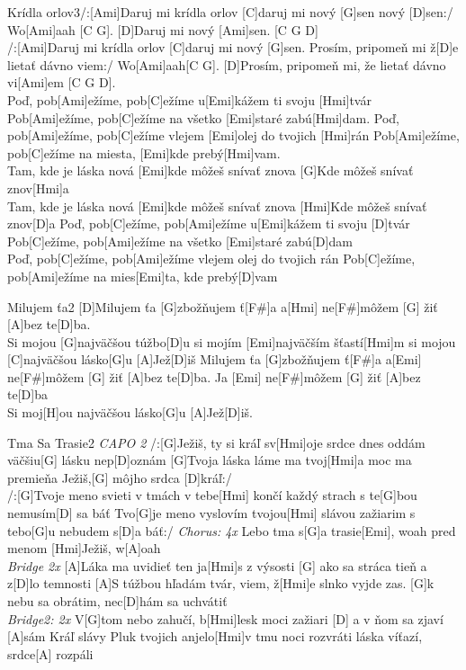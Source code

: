 \documentclass[12pt]{article}
\begin{document}
\begin{song}{Krídla orlov}{3}/:[Ami]Daruj mi krídla orlov
	[C]daruj mi nový [G]sen
	nový [D]sen:/ Wo[Ami]aah [C G].
	[D]Daruj mi nový [Ami]sen. [C G D] 
	\\
	/:[Ami]Daruj mi krídla orlov
	[C]daruj mi nový [G]sen.
	Prosím, pripomeň mi
	ž[D]e lietať dávno viem:/ 
	Wo[Ami]aah[C G].
	[D]Prosím, pripomeň mi,
	že lietať dávno vi[Ami]em [C G D].
	\\
	Poď, pob[Ami]ežíme, pob[C]ežíme
	u[Emi]kážem ti svoju [Hmi]tvár
	Pob[Ami]ežíme, pob[C]ežíme
	na všetko [Emi]staré zabú[Hmi]dam.
	\columnbreak
	Poď, pob[Ami]ežíme, pob[C]ežíme
	vlejem [Emi]olej do tvojich [Hmi]rán
	Pob[Ami]ežíme, pob[C]ežíme
	na miesta, [Emi]kde prebý[Hmi]vam.
	\\
	[C]Tam, kde je láska nová
	[Emi]kde môžeš snívať znova
	[G]Kde môžeš snívať znov[Hmi]a
	\\
	[Ami]Tam, kde je láska nová
	[Emi]kde môžeš snívať znova
	[Hmi]Kde môžeš snívať znov[D]a
	\columnbreak
	Poď, pob[C]ežíme, pob[Ami]ežíme
	u[Emi]kážem ti svoju [D]tvár
	Pob[C]ežíme, pob[Ami]ežíme
	na všetko [Emi]staré zabú[D]dam
	\\
	Poď, pob[C]ežíme, pob[Ami]ežíme
	vlejem olej do tvojich rán
	Pob[C]ežíme, pob[Ami]ežíme
	na mies[Emi]ta, kde prebý[D]vam
\end{song}

\begin{song}{Milujem ťa}{2}
	[D]Milujem ťa
	[G]zbožňujem ť[F#]a
	a[Hmi] ne[F#]môžem [G] žiť [A]bez te[D]ba.
	\\
	Si mojou [G]najväčšou túžbo[D]u
	si mojím [Emi]najväčším šťastí[Hmi]m
	si mojou [C]najväčšou lásko[G]u
	[A]Jež[D]iš
	\columnbreak
	[D]Milujem ťa
	[G]zbožňujem ť[F#]a
	a[Emi] ne[F#]môžem [G] žiť [A]bez te[D]ba.
	Ja [Emi] ne[F#]môžem [G] žiť [A]bez te[D]ba
	\\
	Si moj[H]ou najväčšou lásko[G]u
	[A]Jež[D]iš.
\end{song}

\begin{song}{Tma Sa Trasie}{2}
	\textit{\color{gray}CAPO 2}
	/:[G]Ježiš, ty si kráľ
	sv[Hmi]oje srdce dnes oddám
	väčšiu[G] lásku nep[D]oznám
	[G]Tvoja láska láme ma
	tvoj[Hmi]a moc ma premieňa
	Ježiš,[G] môjho srdca [D]kráľ:/
	\\
	/:[G]Tvoje meno svieti v tmách
	v tebe[Hmi] končí každý strach
	s te[G]bou nemusím[D] sa báť
	Tvo[G]je meno vyslovím
	tvojou[Hmi] slávou zažiarim
	s tebo[G]u nebudem s[D]a báť:/
	\columnbreak
	\textit{\color{gray}Chorus: 4x}
	Lebo tma s[G]a trasie[Emi], woah
	pred menom [Hmi]Ježiš, w[A]oah
	\\
	\textit{\color{gray}Bridge 2x}
	[A]Láka ma uvidieť ten ja[Hmi]s z výsosti
	[G] ako sa stráca tieň a z[D]lo temnosti
	[A]S túžbou hľadám tvár, 
	viem, ž[Hmi]e slnko vyjde zas.
	[G]k nebu sa obrátim, nec[D]hám sa uchvátiť
	\\
	\textit{\color{gray}Bridge2: 2x}
	V[G]tom nebo zahučí, b[Hmi]lesk moci zažiari
	[D] a v ňom sa zjaví [A]sám Kráľ slávy
	Pluk tvojich anjelo[Hmi]v tmu noci rozvráti
	láska víťazí, srdce[A] rozpáli
\end{song}
\end{document}
